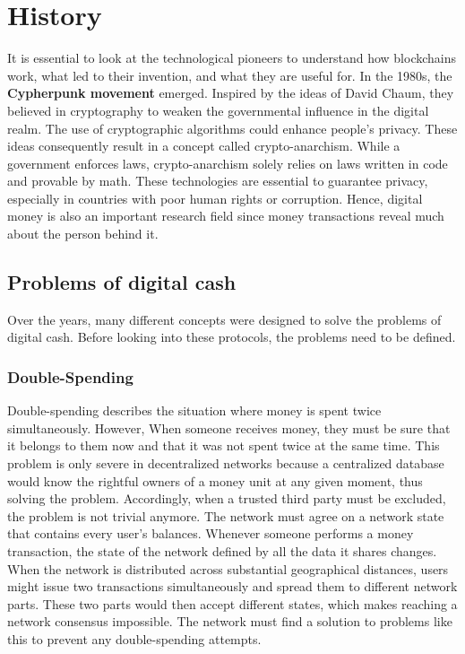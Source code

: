 \chapter{History}
It is essential to look at the technological pioneers to understand how blockchains work, what led to their invention, and what they are useful for.
In the 1980s, the \textbf{Cypherpunk movement} emerged.
Inspired by the ideas of David Chaum, they believed in cryptography to weaken the governmental influence in the digital realm.
The use of cryptographic algorithms could enhance people's privacy.
These ideas consequently result in a concept called crypto-anarchism.
While a government enforces laws, crypto-anarchism solely relies on laws written in code and provable by math.
These technologies are essential to guarantee privacy, especially in countries with poor human rights or corruption.
Hence, digital money is also an important research field since money transactions reveal much about the person behind it. \cite{Narayanan2013}

\section{Problems of digital cash}
Over the years, many different concepts were designed to solve the problems of digital cash.
Before looking into these protocols, the problems need to be defined.

\subsection{Double-Spending}
Double-spending describes the situation where money is spent twice simultaneously. 
However, When someone receives money, they must be sure that it belongs to them now and that it was not spent twice at the same time.
This problem is only severe in decentralized networks because a centralized database would know the rightful owners of a money unit at any given moment, thus solving the problem.
Accordingly, when a trusted third party must be excluded, the problem is not trivial anymore.
The network must agree on a network state that contains every user's balances.
Whenever someone performs a money transaction, the state of the network defined by all the data it shares changes.
When the network is distributed across substantial geographical distances, users might issue two transactions simultaneously and spread them to different network parts.
These two parts would then accept different states, which makes reaching a network consensus impossible.
The network must find a solution to problems like this to prevent any double-spending attempts. \cite{chowan2021}


